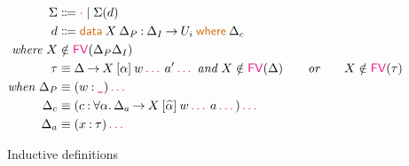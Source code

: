 \documentclass{article}
\newcommand{\meta}[1]{\mathsf{\textcolor{metacolour}{#1}}}
\newcommand{\kw}[1]{\mathsf{\textcolor{kwcolour}{#1}}}
\newcommand{\kwopen}[1]{\kw{#1}\:}
\newcommand{\kwbin}[1]{\:\kw{#1}\:}
\newcommand{\poly}[2]{\forall #1 \mathpunct{.} #2}
\newcommand{\suc}[1]{\widehat{#1}}
\newcommand{\arr}[2]{#1 \mathbin{\rightarrow} #2}
\newcommand{\app}[2]{#1 \: #2}
\newcommand{\App}[2]{#1 \: \mathopen{[} #2 \mathclose{]}}
\newcommand{\data}[3]{\kwopen{data} #1 \mathbin{:} #2 \kwbin{where} #3}
\newcommand{\annot}[2]{#1 \mathbin{:} #2}
\newcommand{\nil}{\meta{\cdot}}
\newcommand{\seq}{\,\meta{\dots}\,}
\newcommand{\any}{\meta{\texttt{\_}}}
\newcommand{\FV}{\meta{FV}}
\begin{document}
\begin{figure}[h]
    \centering
    \begin{align*}
        \Sigma &\Coloneqq \nil \mid \Sigma(d) \\
        d &\Coloneqq \data{\app{X}{\Delta_P}}{\arr{\Delta_I}{U_{i}}}{\Delta_c} \\
        \textit{where} ~ X &\notin \FV(\Delta_P\Delta_I) \\
        \tau &\equiv \arr{\Delta}{\app{\app{\App{X}{\alpha}}{w \seq}}{a' \seq}} ~ \textit{and} ~ X \notin \FV(\Delta) \qquad \textit{or} \qquad X \notin \FV(\tau) \\
        \textit{when} ~ \Delta_P &\equiv (\annot{w}{\any}) \seq \\
        \Delta_c &\equiv (\annot{c}{\poly{\alpha}{\arr{\Delta_a}{\app{\app{\App{X}{\suc{\alpha}}}{w \seq}}{a \seq}}}}) \seq \\
        \Delta_a &\equiv (\annot{x}{\tau}) \seq
    \end{align*}
    \caption{Inductive definitions}
    \label{fig:inductive}
\end{figure}
\end{document}
